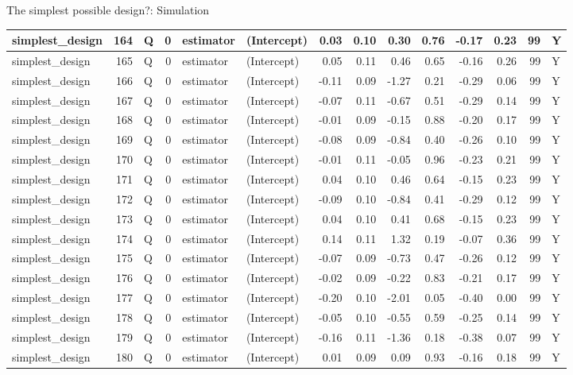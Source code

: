 \documentclass[
  11pt,
  ignorenonframetext,
]{beamer}
\begin{document}
\begin{frame}[fragile]{The simplest possible design?: Simulation}
\begin{tabular}{l|r|l|r|l|l|r|r|r|r|r|r|r|l}
\hline
simplest\_design & 164 & Q & 0 & estimator & (Intercept) & 0.03 & 0.10 & 0.30 & 0.76 & -0.17 & 0.23 & 99 & Y\\
\hline
simplest\_design & 165 & Q & 0 & estimator & (Intercept) & 0.05 & 0.11 & 0.46 & 0.65 & -0.16 & 0.26 & 99 & Y\\
\hline
simplest\_design & 166 & Q & 0 & estimator & (Intercept) & -0.11 & 0.09 & -1.27 & 0.21 & -0.29 & 0.06 & 99 & Y\\
\hline
simplest\_design & 167 & Q & 0 & estimator & (Intercept) & -0.07 & 0.11 & -0.67 & 0.51 & -0.29 & 0.14 & 99 & Y\\
\hline
simplest\_design & 168 & Q & 0 & estimator & (Intercept) & -0.01 & 0.09 & -0.15 & 0.88 & -0.20 & 0.17 & 99 & Y\\
\hline
simplest\_design & 169 & Q & 0 & estimator & (Intercept) & -0.08 & 0.09 & -0.84 & 0.40 & -0.26 & 0.10 & 99 & Y\\
\hline
simplest\_design & 170 & Q & 0 & estimator & (Intercept) & -0.01 & 0.11 & -0.05 & 0.96 & -0.23 & 0.21 & 99 & Y\\
\hline
simplest\_design & 171 & Q & 0 & estimator & (Intercept) & 0.04 & 0.10 & 0.46 & 0.64 & -0.15 & 0.23 & 99 & Y\\
\hline
simplest\_design & 172 & Q & 0 & estimator & (Intercept) & -0.09 & 0.10 & -0.84 & 0.41 & -0.29 & 0.12 & 99 & Y\\
\hline
simplest\_design & 173 & Q & 0 & estimator & (Intercept) & 0.04 & 0.10 & 0.41 & 0.68 & -0.15 & 0.23 & 99 & Y\\
\hline
simplest\_design & 174 & Q & 0 & estimator & (Intercept) & 0.14 & 0.11 & 1.32 & 0.19 & -0.07 & 0.36 & 99 & Y\\
\hline
simplest\_design & 175 & Q & 0 & estimator & (Intercept) & -0.07 & 0.09 & -0.73 & 0.47 & -0.26 & 0.12 & 99 & Y\\
\hline
simplest\_design & 176 & Q & 0 & estimator & (Intercept) & -0.02 & 0.09 & -0.22 & 0.83 & -0.21 & 0.17 & 99 & Y\\
\hline
simplest\_design & 177 & Q & 0 & estimator & (Intercept) & -0.20 & 0.10 & -2.01 & 0.05 & -0.40 & 0.00 & 99 & Y\\
\hline
simplest\_design & 178 & Q & 0 & estimator & (Intercept) & -0.05 & 0.10 & -0.55 & 0.59 & -0.25 & 0.14 & 99 & Y\\
\hline
simplest\_design & 179 & Q & 0 & estimator & (Intercept) & -0.16 & 0.11 & -1.36 & 0.18 & -0.38 & 0.07 & 99 & Y\\
\hline
simplest\_design & 180 & Q & 0 & estimator & (Intercept) & 0.01 & 0.09 & 0.09 & 0.93 & -0.16 & 0.18 & 99 & Y\\

\end{tabular}
\end{frame}
\end{document}
